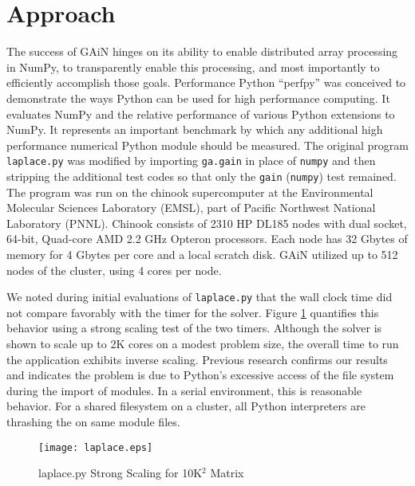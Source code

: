 \documentclass{sig-alt-release2}
\begin{document}
\section{Approach}
The success of GAiN hinges on its ability to enable distributed array
processing in NumPy, to transparently enable this processing, and most
importantly to efficiently accomplish those goals. Performance Python
\cite{Ram08} ``perfpy'' was conceived to demonstrate the ways Python can be
used for high performance computing. It evaluates NumPy and the relative
performance of various Python extensions to NumPy. It represents an important
benchmark by which any additional high performance numerical Python module
should be measured. The original program \texttt{laplace.py} was modified by
importing \texttt{ga.gain} in place of \texttt{numpy} and then stripping the
additional test codes so that only the \texttt{gain} (\texttt{numpy}) test
remained.
The program was run on the chinook supercomputer at the Environmental
Molecular Sciences Laboratory (EMSL), part of Pacific Northwest National
Laboratory (PNNL). Chinook consists of 2310 HP DL185 nodes with dual socket,
64-bit, Quad-core AMD 2.2 GHz Opteron processors. Each node has 32 Gbytes of
memory for 4 Gbytes per core and a local scratch disk.
GAiN utilized up to 512 nodes of the cluster, using 4 cores per node.

We noted during initial evaluations of \texttt{laplace.py} that the wall clock
time did not compare favorably with the timer for the solver. Figure
\ref{fig:laplace} quantifies this behavior using a strong scaling test of the
two timers. Although the solver is shown to scale up to 2K cores on a modest
problem size, the overall time to run the application exhibits inverse scaling.
Previous research \cite{Scu11,Man11} confirms our results and indicates the
problem is due to Python's excessive access of the file system during the
import of modules. In a serial environment, this is reasonable behavior. For a
shared filesystem on a cluster, all Python interpreters are thrashing the on
same module files.

\begin{figure}
\centering
\texttt{[image: laplace.eps]}
\caption{laplace.py Strong Scaling for 10K$^2$ Matrix}
\label{fig:laplace}
\end{figure}
\end{document}

